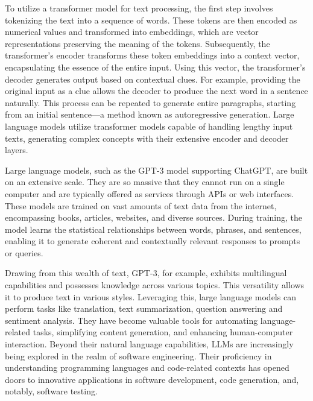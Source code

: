 To utilize a transformer model for text processing, the first step involves tokenizing the text into a sequence of words\cite{vaswani_attention_2017}. These tokens are then encoded as numerical values and transformed into embeddings, which are vector representations preserving the meaning of the tokens. Subsequently, the transformer's encoder transforms these token embeddings into a context vector, encapsulating the essence of the entire input. Using this vector, the transformer's decoder generates output based on contextual clues. For example, providing the original input as a clue allows the decoder to produce the next word in a sentence naturally. This process can be repeated to generate entire paragraphs, starting from an initial sentence—a method known as autoregressive generation\cite{Autoregressive}. Large language models utilize transformer models capable of handling lengthy input texts, generating complex concepts with their extensive encoder and decoder layers.

Large language models, such as the GPT-3 model supporting ChatGPT, are built on an extensive scale. They are so massive that they cannot run on a single computer and are typically offered as services through APIs or web interfaces. These models are trained on vast amounts of text data from the internet, encompassing books, articles, websites, and diverse sources\cite{kaddour2023challenges}. During training, the model learns the statistical relationships between words, phrases, and sentences, enabling it to generate coherent and contextually relevant responses to prompts or queries.

Drawing from this wealth of text, GPT-3, for example, exhibits multilingual capabilities and possesses knowledge across various topics. This versatility allows it to produce text in various styles. Leveraging this, large language models can perform tasks like translation, text summarization, question answering and sentiment analysis\cite{petroni_language_2019}. They have become valuable tools for automating language-related tasks, simplifying content generation, and enhancing human-computer interaction. Beyond their natural language capabilities, LLMs are increasingly being explored in the realm of software engineering. Their proficiency in understanding programming languages and code-related contexts has opened doors to innovative applications in software development, code generation, and, notably, software testing\cite{gabriel_ryan_toga_2022}.

